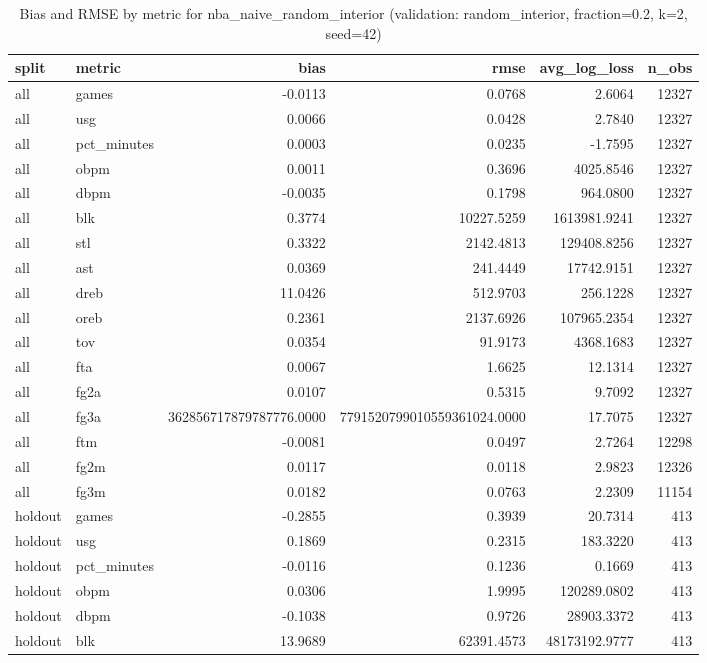 \begin{table}
\caption{Bias and RMSE by metric for nba_naive_random_interior (validation: random_interior, fraction=0.2, k=2, seed=42)}
\label{tab:nba_naive_random_interior_vs_random_interior_f20_k2_s42_bias_rmse}
\begin{tabular}{llrrrr}
\toprule
split & metric & bias & rmse & avg\_log\_loss & n\_obs \\
\midrule
all & games & -0.0113 & 0.0768 & 2.6064 & 12327 \\
all & usg & 0.0066 & 0.0428 & 2.7840 & 12327 \\
all & pct\_minutes & 0.0003 & 0.0235 & -1.7595 & 12327 \\
all & obpm & 0.0011 & 0.3696 & 4025.8546 & 12327 \\
all & dbpm & -0.0035 & 0.1798 & 964.0800 & 12327 \\
all & blk & 0.3774 & 10227.5259 & 1613981.9241 & 12327 \\
all & stl & 0.3322 & 2142.4813 & 129408.8256 & 12327 \\
all & ast & 0.0369 & 241.4449 & 17742.9151 & 12327 \\
all & dreb & 11.0426 & 512.9703 & 256.1228 & 12327 \\
all & oreb & 0.2361 & 2137.6926 & 107965.2354 & 12327 \\
all & tov & 0.0354 & 91.9173 & 4368.1683 & 12327 \\
all & fta & 0.0067 & 1.6625 & 12.1314 & 12327 \\
all & fg2a & 0.0107 & 0.5315 & 9.7092 & 12327 \\
all & fg3a & 362856717879787776.0000 & 7791520799010559361024.0000 & 17.7075 & 12327 \\
all & ftm & -0.0081 & 0.0497 & 2.7264 & 12298 \\
all & fg2m & 0.0117 & 0.0118 & 2.9823 & 12326 \\
all & fg3m & 0.0182 & 0.0763 & 2.2309 & 11154 \\
holdout & games & -0.2855 & 0.3939 & 20.7314 & 413 \\
holdout & usg & 0.1869 & 0.2315 & 183.3220 & 413 \\
holdout & pct\_minutes & -0.0116 & 0.1236 & 0.1669 & 413 \\
holdout & obpm & 0.0306 & 1.9995 & 120289.0802 & 413 \\
holdout & dbpm & -0.1038 & 0.9726 & 28903.3372 & 413 \\
holdout & blk & 13.9689 & 62391.4573 & 48173192.9777 & 413 \\

\end{tabular}
\end{table}
